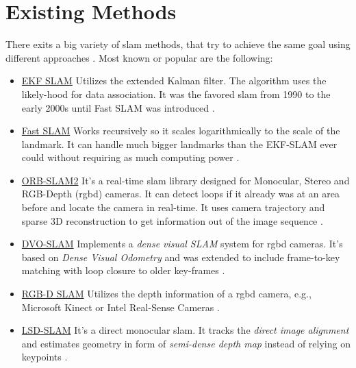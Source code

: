 \section{Existing Methods}
There exits a big variety of \gls{slam} methods, that try to achieve the same goal using different approaches \cite{openslam}.
Most known or popular are the following:
\begin{itemize}
    \item \underline{EKF SLAM} \newline
    Utilizes the extended Kalman filter. The algorithm  uses the likely-hood for data association.
    It was the favored \gls{slam} from 1990 to the early 2000s until Fast SLAM was introduced \cite{Fastslam}. 
    
    \item \underline{Fast SLAM} \newline
    Works recursively so it scales logarithmically to the scale of the landmark. It can handle much bigger landmarks than the EKF-SLAM ever could without requiring as much computing power \cite{Fastslam}. 
    
    \item \underline{ORB-SLAM2} \newline
    It's a real-time \gls{slam} library designed for Monocular, Stereo and RGB-Depth (\gls{rgbd}) cameras. It can detect loops if it already was at an area before and locate the camera in real-time. It uses camera trajectory and sparse 3D reconstruction to get information out of the image sequence \cite{orbslam}.
    
    \item \underline{DVO-SLAM} \newline
    Implements a \textit{dense visual SLAM} system for \gls{rgbd} cameras. It's based on \textit{Dense Visual Odometry} and was extended to include frame-to-key matching with loop closure to older key-frames \cite{dvoslam1}. 
    
    \item \underline{RGB-D SLAM} \newline
    Utilizes the depth information of a \gls{rgbd} camera, e.g., Microsoft Kinect or Intel Real-Sense Cameras \cite{rosrgbdslam}.
    
    \item \underline{LSD-SLAM} \newline
    It's a direct monocular \gls{slam}. It tracks the \textit{direct image alignment} and estimates geometry in form of \textit{semi-dense depth map} instead of relying on keypoints \cite{lsdslam_eccv}.
\end{itemize}